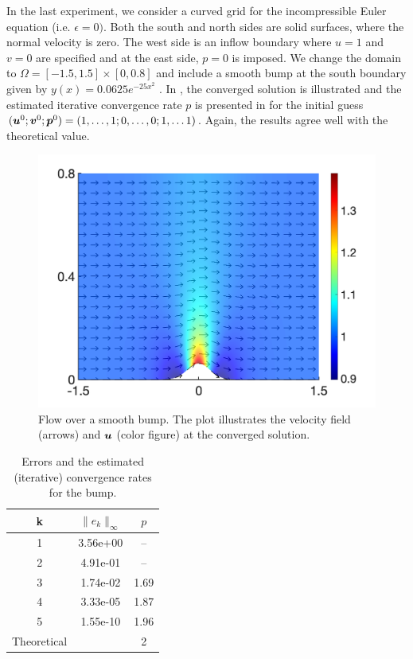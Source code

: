 In the last experiment, we consider a curved grid \cite{aalund2019encapsulated} for the incompressible Euler equation (i.e. $\epsilon = 0)$. Both the south and north sides are solid surfaces, where the normal velocity is zero. The west side is an inflow boundary where $u = 1$ and $v = 0$ are specified and at the east side, $p = 0$ is imposed. We change the domain to $\Omega = [-1.5,1.5]\times [0, 0.8]$ and include a smooth bump at the south boundary given by $y(x) = 0.0625e^{-25x^2}$ \cite{bumpgrid} . In , the converged solution is illustrated and the estimated iterative convergence rate $p$ is presented in  for the initial guess $(\bm{u}^0;\bm{v}^0;\bm{p}^0) = (1, \dots,1; 0, \dots ,0; 1,\dots 1)$. Again, the results agree well with the theoretical value.
\begin{figure}
 \centering
  \includegraphics[scale = 0.3]{images/bump.png}
  \caption{Flow over a smooth bump. The plot illustrates the velocity field (arrows) and $\bm{u}$ (color figure) at the converged solution.}
  \label{fig:bump}
\end{figure}

\begin{table}
\centering
\caption{Errors and the estimated (iterative) convergence rates for the bump.}
\begin{tabular}{c| cc }
 \hline
k & $\|e_k\|_\infty$ & $p$
\\
\hline
1 &  3.56e+00 & --  \\
2 &  4.91e-01 & --  \\
3 &  1.74e-02 & 1.69 \\
4 &  3.33e-05 & 1.87 \\
5 &  1.55e-10 & 1.96 \\
\hline
Theoretical && 2
\end{tabular}
\label{tab:bump}
\end{table}
